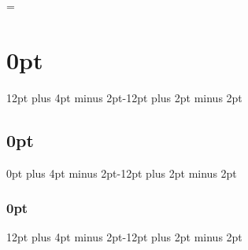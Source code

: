 \documentclass[12pt, a4paper, oneside]{article}
\begin{document}
\doublespacing

 
\newpage

\newpage
\tableofcontents
\listoffigures
\listoftables
\newpage
\parskip=\baselineskip
\titlespacing\section{0pt}{12pt plus 4pt minus 2pt}{-12pt plus 2pt minus 2pt}
\titlespacing\subsection{0pt}{0pt plus 4pt minus 2pt}{-12pt plus 2pt minus 2pt}
\titlespacing\subsubsection{0pt}{12pt plus 4pt minus 2pt}{-12pt plus 2pt minus 2pt}










\newpage
\printbibliography
\newpage
\appendix

\end{document}
